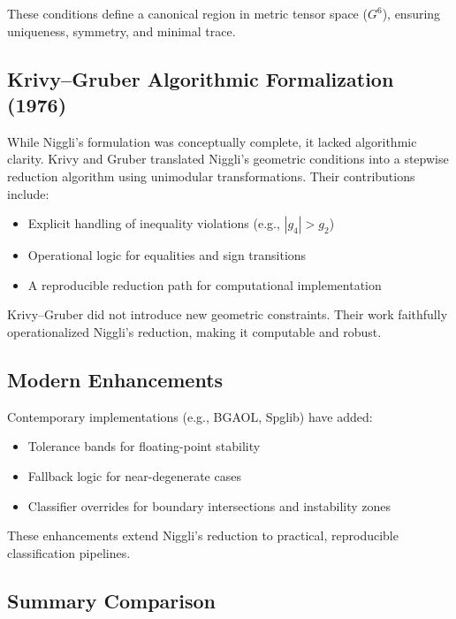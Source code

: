 \documentclass[preprint]{iucr}              %
\begin{document}
These conditions define a canonical region in metric tensor space ($G^6$), ensuring uniqueness, symmetry, and minimal trace.

\subsection*{Krivy--Gruber Algorithmic Formalization (1976)}

While Niggli's formulation was conceptually complete, it lacked algorithmic clarity. Krivy and Gruber translated Niggli's geometric conditions into a stepwise reduction algorithm using unimodular transformations. Their contributions include:

\begin{itemize}
	\item Explicit handling of inequality violations (e.g., $|g_4| > g_2$)
	\item Operational logic for equalities and sign transitions
	\item A reproducible reduction path for computational implementation
\end{itemize}

Krivy--Gruber did not introduce new geometric constraints. Their work faithfully operationalized Niggli’s reduction, making it computable and robust.

\subsection*{Modern Enhancements}

Contemporary implementations (e.g., BGAOL, Spglib) have added:

\begin{itemize}
	\item Tolerance bands for floating-point stability
	\item Fallback logic for near-degenerate cases
	\item Classifier overrides for boundary intersections and instability zones
\end{itemize}

These enhancements extend Niggli’s reduction to practical, reproducible classification pipelines.

\subsection{Summary Comparison}
\end{document}
